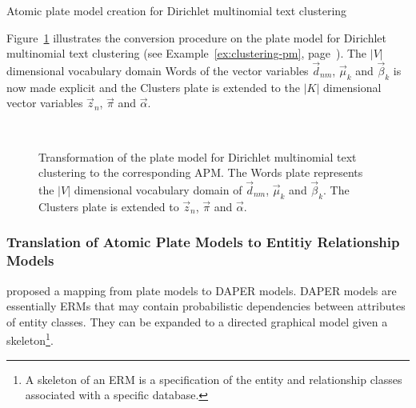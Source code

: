 \begin{Example} Atomic plate model creation for Dirichlet multinomial text clustering

Figure~\ref{fig:clustering_platemodels} illustrates the conversion procedure on the plate model for Dirichlet multinomial text clustering (see Example~\ref{ex:clustering-pm}, page~\pageref{ex:clustering-pm}). The $|V|$ dimensional vocabulary domain Words of the vector variables $\vec d_{nm}$, $\vec \mu_k$ and $\vec \beta_k$ is now made explicit and the Clusters plate is extended to the $|K|$ dimensional vector variables $\vec z_n$, $\vec \pi$ and $\vec \alpha$.

\begin{figure}[h!]
\begin{minipage}[t]{0.49\linewidth}
	\begin{center}
	\end{center}
\end{minipage}
\hspace{0.0cm}
\begin{minipage}[t]{0.49\linewidth}
	\begin{center}
	\end{center}
\end{minipage}\\
\caption{Transformation of the plate model for Dirichlet multinomial text clustering to the corresponding APM. The Words plate represents the $|V|$ dimensional vocabulary domain of $\vec d_{nm}$, $\vec \mu_k$ and $\vec \beta_k$. The Clusters plate is extended to $\vec z_n$, $\vec \pi$ and $\vec \alpha$.}
\label{fig:clustering_platemodels}
\end{figure}

\end{Example}

\subsubsection{Translation of Atomic Plate Models to Entitiy Relationship Models}

\textcite{heckerman2007probabilistic} proposed a mapping from plate models to DAPER models. DAPER models are essentially ERMs that may contain probabilistic dependencies between attributes of entity classes. They can be expanded to a directed graphical model given a skeleton\footnote{A skeleton of an ERM is a specification of the entity and relationship classes associated with a specific database.}.

